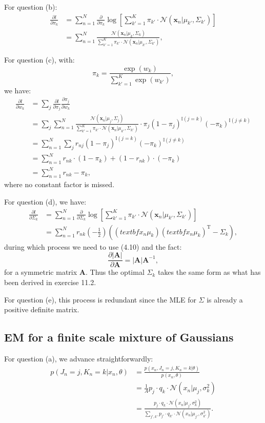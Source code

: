 \documentclass[UTF8]{ctexart}
\begin{document}
For question (b):
$$
\begin{aligned}
\frac{\partial l}{\partial \pi_{k}}&=\sum_{n=1}^{N}\frac{\partial}{\partial \pi_{k}}\log \left[\sum_{k'=1}^{K}\pi_{k'}\cdot\mathcal{N}(\textbf{x}_{n}|\mu_{k'},\Sigma_{k'}) \right]\\
&=\sum_{n=1}^{N} \frac{\mathcal{N}(\textbf{x}_{n}|\mu_{k},\Sigma_{k})}{\sum_{k'=1}^{K}\pi_{k'}\cdot\mathcal{N}(\textbf{x}_{n}|\mu_{k'},\Sigma_{k'})},
\end{aligned}
$$

For question (c), with:
$$\pi_{k}=\frac{\exp(w_{k})}{\sum_{k'=1}^{K}\exp(w_{k'})},$$
we have:
$$
\begin{aligned}
\frac{\partial l}{\partial w_{k}}&=\sum_{j}\frac{\partial l}{\partial \pi_{j}}\frac{\partial \pi_{j}}{\partial w_{k}}\\
&=\sum_{j}\sum_{n=1}^{N}\frac{\mathcal{N}(\textbf{x}_{n}|\mu_{j},\Sigma_{j})}{\sum_{k'=1}^{K}\pi_{k'}\cdot\mathcal{N}(\textbf{x}_{n}|\mu_{k'},\Sigma_{k'})}\cdot\pi_{j}(1-\pi_{j})^{\mathbb{I}(j=k)}(-\pi_{k})^{\mathbb{I}(j\neq k)}\\
&=\sum_{n=1}^{N}\sum_{j}r_{nj}(1-\pi_{j})^{\mathbb{I}(j=k)}(-\pi_{k})^{\mathbb{I}(j\neq k)}\\
&=\sum_{n=1}^{N}r_{nk}\cdot(1-\pi_{k})+(1-r_{nk})\cdot(-\pi_{k})\\
&=\sum_{n=1}^{N}r_{nk}-\pi_{k},
\end{aligned}
$$
where no constant factor is missed.

For question (d), we have:
$$
\begin{aligned}
\frac{\partial l}{\partial \Sigma_{k}}&=\sum_{n=1}^{N}\frac{\partial}{\partial\Sigma_{k}}\log\left[\sum_{k'=1}^{K}\pi_{k'}\cdot\mathcal{N}(\textbf{x}_{n}|\mu_{k'},\Sigma_{k'}) \right]\\
&=\sum_{n=1}^{N}r_{nk}\left(-\frac{1}{2}\right)\left((textbf{x}_{n}\mu_{k})(textbf{x}_{n}\mu_{k})^{\text{T}}-\Sigma_{k} \right),
\end{aligned}
$$
during which process we need to use (4.10) and the fact:
$$\frac{\partial |\textbf{A}|}{\partial \textbf{A}}=|\textbf{A}|\textbf{A}^{-1},$$
for a symmetric matrix $\textbf{A}$.
Thus the optimal $\Sigma_{k}$ takes the same form as what has been derived in exercise 11.2.

For question (e), this process is redundant since the MLE for $\Sigma$ is already a positive definite matrix.

\subsection{EM for a finite scale mixture of Gaussians}
For question (a), we advance straightforwardly:
$$
\begin{aligned}
p(J_{n}=j,K_{n}=k|x_{n},\theta)&=\frac{p(x_{n},J_{n}=j,K_{n}=k|\theta)}{p(x_{n},\theta)}\\
&=\frac{1}{A} p_{j}\cdot q_{k}\cdot\mathcal{N}(x_{n}|\mu_{j},\sigma^{2}_{k})\\
&=\frac{p_{j}\cdot q_{k}\cdot\mathcal{N}(x_{n}|\mu_{j},\sigma^{2}_{k}) }{\sum_{j',k'} p_{j'}\cdot q_{k'}\cdot\mathcal{N}(x_{n}|\mu_{j'},\sigma^{2}_{k'})}.
\end{aligned}
$$
\end{document}
